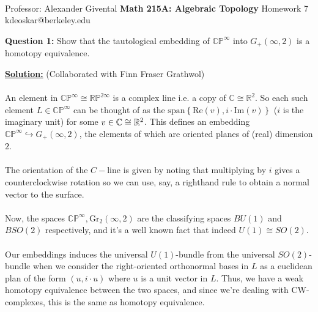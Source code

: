\documentclass[11pt]{article}
\begin{document}
\thispagestyle{empty}
\bigskip \
\vspace{0.1cm}

\begin{center}
{\fontsize{22}{22} \selectfont Professor: Alexander Givental}
\vskip 16pt
{\fontsize{30}{30} \selectfont \bf \sffamily Math 215A: Algebraic Topology}
\vskip 24pt
{\fontsize{14}{14} \selectfont \rmfamily Homework 7} 
\vskip 6pt
{\fontsize{14}{14} \selectfont \ttfamily kdeoskar@berkeley.edu} 
\vskip 24pt
\end{center}





\begin{bluebox}
  \textbf{Question 1:} Show that the tautological embedding of $\mathbb{CP}^{\infty}$ into $G_+(\infty, 2)$ is a homotopy equivalence. 
\end{bluebox}

\vskip 0.5cm
\textbf{\underline{Solution:}} (Collaborated with Finn Fraser Grathwol)
\\
\\
An element in $\mathbb{CP}^{\infty} \cong \mathbb{RP}^{2\infty}$ is a complex line i.e. a copy of $\mathbb{C} \cong \mathbb{R}^{2}$. So each such element $L \in \mathbb{CP}^{\infty}$ can be thought of as the $\mathrm{span}\left\{ \mathrm{Re}(v), i \cdot \mathrm{Im}(v) \right\}$ ($i$ is the imaginary unit) for some $v \in \mathbb{C} \cong \mathbb{R}^2$. This defines an embedding $\mathbb{CP}^{\infty} \hookrightarrow G_+(\infty, 2)$, the elements of which are oriented planes of (real) dimension $2$.
\\
\\
The orientation of the $C-$line is given by noting that multiplying by $i$ gives a counterclockwise rotation so we can use, say, a righthand rule to obtain a normal vector to the surface.
\\
\\
Now, the spaces $\mathbb{CP}^{\infty}, \mathrm{Gr}_2(\infty, 2)$ are the classifying spaces $BU(1)$ and $BSO(2)$ respectively, and it's a well known fact that indeed $U(1) \cong SO(2)$.
\\
\\
Our embeddings induces the universal $U(1)$-bundle from the universal $SO(2)$-bundle when we consider the right-oriented orthonormal bases in $L$ as a euclidean plan of the form $(u, i \cdot u)$ where $u$ is a unit vector in $L$. Thus, we have a weak homotopy equivalence between the two spaces, and since we're dealing with CW-complexes, this is the same as homotopy equivalence.
\end{document}
